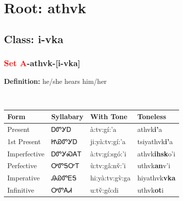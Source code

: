 \needspace{4in}
\section*{Root: athvk}
\nopagebreak
{}
\needspace{3in}
\subsection*{Class: i-vka}
\nopagebreak
\needspace{2in}
\subsubsection*{\textcolor{Red}{Set A}{-}\textbf{athvk}{-}[i-vka]}
\nopagebreak
\textbf{Definition: } he/she hears him/her
\\[0.5em]
\begin{tabularx}{\textwidth}{l X X X}%
\toprule%
\textbf{Form}&\textbf{Syllabary}&\textbf{With Tone}&\textbf{Toneless}\\%
\midrule%
Present&ᎠᏛᎩᎠ&à:tv:gí:’a&athvk\textbf{i'}a\\%
1st Present&ᏥᏯᏛᎩᎠ&ji:yà:tv:gí:’a&tsiyathvk\textbf{i'}a\\%
Imperfective&ᎠᏛᎩᏍᎪᎢ&à:tv:gí:sgó:’i&athvk\textbf{ihsk}o'i\\%
Perfective&ᎤᏛᎦᏅᎢ&ù:tv:gâ:nv̌:’i&uthvk\textbf{an}v'i\\%
Imperative&ᎯᏯᏛᎬᎦ&hi:yà:tv:gv̀:ga&hiyathvk\textbf{vka}\\%
Infinitive&ᎤᏛᎪᏗ&u:tv̌:gô:di&uthvk\textbf{ot}i\\%
\bottomrule%
\end{tabularx}
\\[1em]